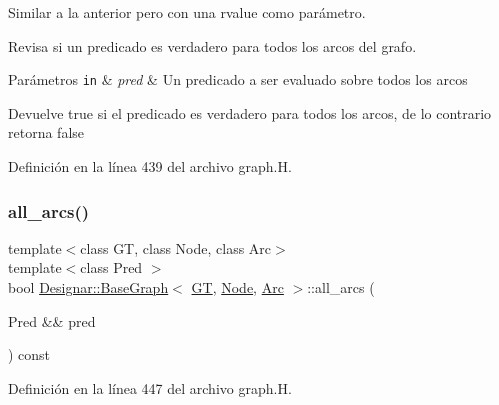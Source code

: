 Similar a la anterior pero con una rvalue como parámetro. 

Revisa si un predicado es verdadero para todos los arcos del grafo.


\begin{DoxyParams}[1]{Parámetros}
\mbox{\tt in}  & {\em pred} & Un predicado a ser evaluado sobre todos los arcos \\
\hline
\end{DoxyParams}
\begin{DoxyReturn}{Devuelve}
{\ttfamily true} si el predicado es verdadero para todos los arcos, de lo contrario retorna {\ttfamily false} 
\end{DoxyReturn}


Definición en la línea 439 del archivo graph.\+H.

\mbox{\label{class_designar_1_1_base_graph_aea71a873faf7e92195d582b21d14c347}} 
\subsubsection{\texorpdfstring{all\+\_\+arcs()}{all\_arcs()}\hspace{0.1cm}{\footnotesize\ttfamily [2/2]}}
{\footnotesize\ttfamily template$<$class GT, class Node, class Arc$>$ \\
template$<$class Pred $>$ \\
bool \hyperlink{class_designar_1_1_base_graph}{Designar\+::\+Base\+Graph}$<$ \hyperlink{demo-buildgraph_8_c_a3001c40d2c31ca87ed96cd7d1334a55e}{GT}, \hyperlink{namespace_designar_a5af326c65aa2bd26b26c410f2030d09e}{Node}, \hyperlink{namespace_designar_a3f55fb5513d62ff47cbc8f72b8e95d6f}{Arc} $>$\+::all\+\_\+arcs (\begin{DoxyParamCaption}\item[{Pred \&\&}]{pred }\end{DoxyParamCaption}) const\hspace{0.3cm}{\ttfamily [inline]}}



Definición en la línea 447 del archivo graph.\+H.

\mbox{\label{class_designar_1_1_base_graph_abad9513273c1096aba652e211180061c}} 
